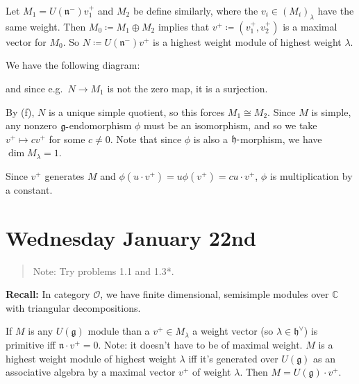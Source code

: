 \documentclass[11pt]{scrartcl}
\theoremstyle{definition}
\theoremstyle{theorem}
\theoremstyle{proof}
\newenvironment{proof}
{\pushQED{$\qed$}\pf}
{\par\popQED\endpf}
\theoremstyle{definition}
\theoremstyle{break}
\theoremstyle{problem}
\newcommand{\CC}[0]{{\mathbb{C}}}
\newcommand{\dash}[0]{{\hbox{-}}}
\newcommand{\definedas}[0]{\coloneqq}
\newcommand{\dual}[0]{^\vee}
\newcommand{\lieg}[0]{{\mathfrak{g}}}
\newcommand{\lieh}[0]{{\mathfrak{h}}}
\newcommand{\lien}[0]{{\mathfrak{n}}}
\renewcommand{\qed}[0]{\hfill\blacksquare}
\renewcommand{\to}[0]{\longrightarrow}
\begin{document}
\begin{proof}[of (g)]

Let \(M_1 = U(\lien^-)v_1^+\) and \(M_2\) be define similarly, where the
\(v_i \in (M_i)_\lambda\) have the same weight. Then
\(M_0 \definedas M_1 \oplus M_2\) implies that
\(v^+ \definedas (v_1^+, v_2^+)\) is a maximal vector for \(M_0\). So
\(N \definedas U(\lien^-) v^+\) is a highest weight module of highest
weight \(\lambda\).

We have the following diagram:

\begin{center}
\end{center}

and since e.g.~\(N \to M_1\) is not the zero map, it is a surjection.

By (f), \(N\) is a unique simple quotient, so this forces
\(M_1 \cong M_2\). Since \(M\) is simple, any nonzero
\(\lieg\dash\)endomorphism \(\phi\) must be an isomorphism, and so we
take \(v^+ \mapsto cv^+\) for some \(c\neq 0\). Note that since \(\phi\)
is also a \(\lieh\dash\)morphism, we have \(\dim M_\lambda = 1\).

Since \(v^+\) generates \(M\) and
\(\phi(u\cdot v^+) = u \phi(v^+) = cu\cdot v^+\), \(\phi\) is
multiplication by a constant.\end{proof}

\hypertarget{wednesday-january-22nd}{%
\section{Wednesday January 22nd}\label{wednesday-january-22nd}}

\begin{quote}
Note: Try problems 1.1 and 1.3*.
\end{quote}

\textbf{Recall:} In category \(\mathcal O\), we have finite dimensional,
semisimple modules over \(\CC\) with triangular decompositions.

If \(M\) is any \(U(\lieg)\) module than a \(v^+ \in M_\lambda\) a
weight vector (so \(\lambda \in \lieh\dual\)) is primitive iff
\(\lien \cdot v^+ = 0\). Note: it doesn't have to be of maximal weight.
\(M\) is a highest weight module of highest weight \(\lambda\) iff it's
generated over \(U(\lieg)\) as an associative algebra by a maximal
vector \(v^+\) of weight \(\lambda\). Then \(M = U(\lieg) \cdot v^+\).
\end{document}
